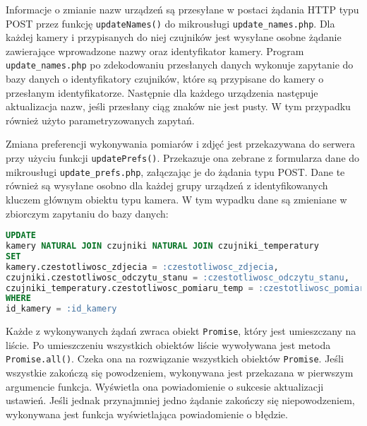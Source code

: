 \documentclass[a4paper,11pt,twoside]{article}
\begin{document}
Informacje o zmianie nazw urządzeń są przesyłane w postaci żądania HTTP typu POST przez funkcję \texttt{updateNames()} do mikrousługi \texttt{update{\_}names.php}. Dla każdej kamery i przypisanych do niej czujników jest wysyłane osobne żądanie zawierające wprowadzone nazwy oraz identyfikator kamery. Program \texttt{update{\_}names.php} po zdekodowaniu przesłanych danych wykonuje zapytanie do bazy danych o identyfikatory czujników, które są przypisane do kamery o przesłanym identyfikatorze. Następnie dla każdego urządzenia następuje aktualizacja nazw, jeśli przesłany ciąg znaków nie jest pusty. W tym przypadku również użyto parametryzowanych zapytań.

Zmiana preferencji wykonywania pomiarów i zdjęć jest przekazywana do serwera przy użyciu funkcji \texttt{updatePrefs()}. Przekazuje ona zebrane z formularza dane do mikrousługi \texttt{update{\_}prefs.php}, załączając je do żądania typu POST. Dane te również są wysyłane osobno dla każdej grupy urządzeń z identyfikowanych kluczem głównym obiektu typu kamera. W tym wypadku dane są zmieniane w zbiorczym zapytaniu do bazy danych:
\begin{lstlisting}[language=SQL]
UPDATE 
kamery NATURAL JOIN czujniki NATURAL JOIN czujniki_temperatury 
SET 
kamery.czestotliwosc_zdjecia = :czestotliwosc_zdjecia, 
czujniki.czestotliwosc_odczytu_stanu = :czestotliwosc_odczytu_stanu,
czujniki_temperatury.czestotliwosc_pomiaru_temp = :czestotliwosc_pomiaru_temp
WHERE 
id_kamery = :id_kamery
\end{lstlisting}

Każde z wykonywanych żądań zwraca obiekt \texttt{Promise}, który jest umieszczany na liście. Po umieszczeniu wszystkich obiektów liście wywoływana jest metoda \texttt{Promise.all()}. Czeka ona na rozwiązanie wszystkich obiektów \texttt{Promise}. Jeśli wszystkie zakończą się powodzeniem, wykonywana jest przekazana w pierwszym argumencie funkcja. Wyświetla ona powiadomienie o sukcesie aktualizacji ustawień. Jeśli jednak przynajmniej jedno żądanie zakończy się niepowodzeniem, wykonywana jest funkcja wyświetlająca powiadomienie o błędzie.
\end{document}
